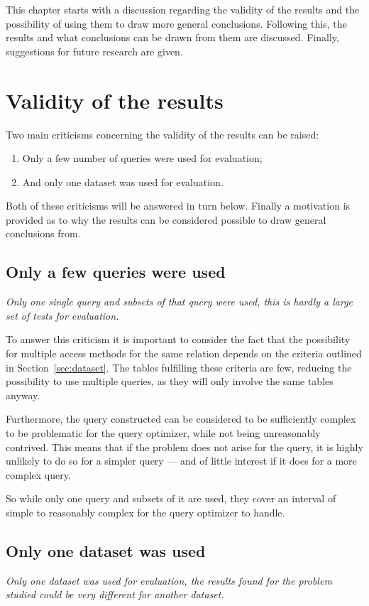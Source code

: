 This chapter starts with a discussion regarding the validity of the results and the
possibility of using them to draw more general conclusions. Following this, the results
and what conclusions can be drawn from them are discussed. Finally, suggestions
for future research are given.

\section{Validity of the results}\label{sec:validity}
Two main criticisms concerning the validity of the results can be raised:
\begin{enumerate}
\item Only a few number of queries were used for evaluation;
\item And only one dataset was used for evaluation.
\end{enumerate}

Both of these criticisms will be answered in turn below. Finally a motivation
is provided as to why the results can be considered possible to draw general
conclusions from.

\subsection{Only a few queries were used}
\textit{Only one single query and subsets of that query were used, this is hardly a
  large set of tests for evaluation.}

To answer this criticism it is important to consider the fact that the
possibility for multiple access methods for the same relation depends on the
criteria outlined in Section~\ref{sec:dataset}. The tables fulfilling these
criteria are few, reducing the possibility to use multiple queries, as they will
only involve the same tables anyway.

Furthermore, the query constructed can be considered to be sufficiently complex
to be problematic for the query optimizer, while not being unreasonably
contrived. This means that if the problem does not arise for the query, it is
highly unlikely to do so for a simpler query --- and of little interest if it
does for a more complex query.

So while only one query and subsets of it are used, they cover an interval
of simple to reasonably complex for the query optimizer to handle.

\subsection{Only one dataset was used}\label{sec:validity:dataset}
\textit{Only one dataset was used for evaluation, the results found for the
  problem studied could be very different for another dataset.}

